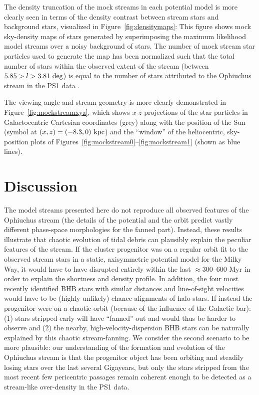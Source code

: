 \documentclass[letterpaper,12pt,preprint]{aastex}
\renewcommand{\changes}[1]{#1}
\begin{document}
The density truncation of the mock streams in each potential model is more clearly seen in terms of the density contrast between stream stars and background stars, visualized in Figure~\ref{fig:densitymaps}: This figure shows mock sky-density maps of stars generated by superimposing the maximum likelihood model streams over a noisy background of stars. The number of mock stream star particles used to generate the map has been normalized such that the total number of stars within the observed extent of the stream (between $5.85 > l > 3.81~{\rm deg}$) is equal to the number of stars attributed to the Ophiuchus stream in the PS1 data \citep[$N \approx 500$][]{bernard14}.

The viewing angle and stream geometry is more clearly demonstrated in Figure~\ref{fig:mockstreamxyz}, which shows $x$-$z$ projections of the star particles in Galactocentric Cartesian coordinates (grey) along with the position of the Sun (symbol at $(x,z)=(-8.3,0)~{\rm kpc}$) and the ``window'' of the heliocentric, sky-position plots of Figures~\ref{fig:mockstream0}--\ref{fig:mockstream1} (shown as blue lines).

\section{Discussion}\label{sec:discussion}

The model streams presented here do not reproduce all observed features of the Ophiuchus stream (the details of the potential and the orbit predict vastly different phase-space morphologies for the fanned part). Instead, these results illustrate that chaotic evolution of tidal debris can plausibly explain the peculiar features of the stream. \changes{If the cluster progenitor was on a regular orbit fit to the observed stream stars in a static, axisymmetric potential model for the Milky Way}, it would have to have disrupted entirely within the last $\approx$300--600 Myr in order to explain the shortness and density profile. In addition, the four most recently identified BHB stars with similar distances and line-of-sight velocities would have to be (highly unlikely) chance alignments of halo stars. If instead the progenitor were on a chaotic orbit (because of the influence of the Galactic bar): (1) stars stripped early will have ``fanned'' out and would thus be harder to observe and (2) the nearby, high-velocity-dispersion BHB stars can be naturally explained by this chaotic stream-fanning. We consider the second scenario to be more plausible: our understanding of the formation and evolution of the Ophiuchus stream is that the progenitor object has been orbiting and steadily losing stars over the last several Gigayears, but only the stars stripped from the most recent few pericentric passages remain coherent enough to be detected as a stream-like over-density in the PS1 data.
\end{document}
